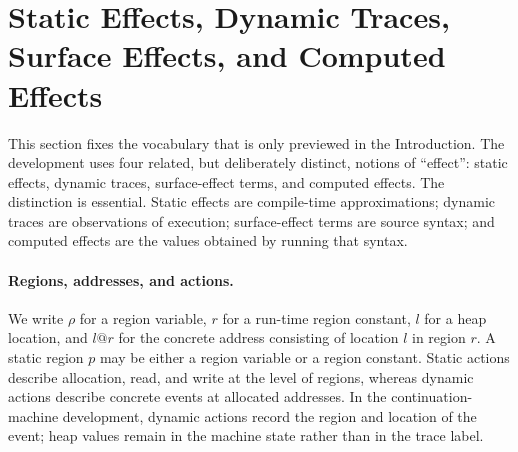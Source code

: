 \documentclass[10pt,a4paper]{article}
\makeatletter
\newcommand{\at}{\mathord{@}}
\makeatother
\begin{document}
\section{Static Effects, Dynamic Traces, Surface Effects, and Computed Effects}
\label{sec:effects}

This section fixes the vocabulary that is only previewed in the Introduction.
The development uses four related, but deliberately distinct, notions of
``effect'': static effects, dynamic traces, surface-effect terms, and computed
effects. The distinction is essential. Static effects are compile-time
approximations; dynamic traces are observations of execution; surface-effect
terms are source syntax; and computed effects are the values obtained by running
that syntax.

\paragraph{Regions, addresses, and actions.}
We write $\rho$ for a region variable, $r$ for a run-time region constant,
$l$ for a heap location, and $l\at r$ for the concrete address consisting of
location $l$ in region $r$. A static region $p$ may be either a region variable
or a region constant. Static actions describe allocation, read, and write at the
level of regions, whereas dynamic actions describe concrete events at allocated
addresses. In the continuation-machine development, dynamic actions record the
region and location of the event; heap values remain in the machine state rather
than in the trace label.
\end{document}
